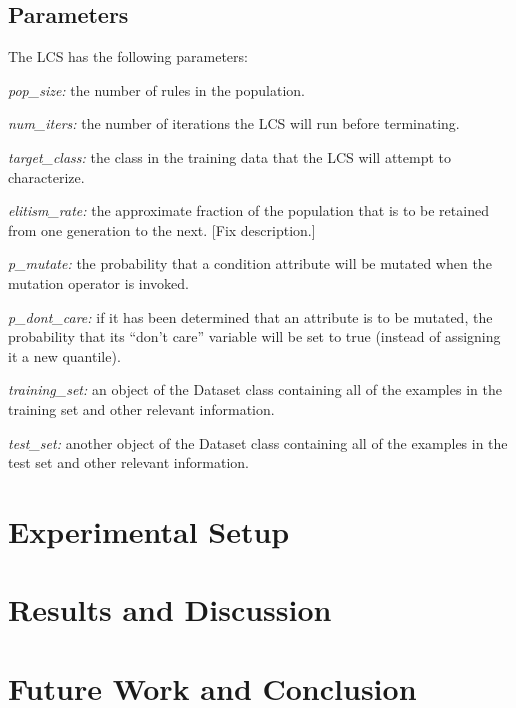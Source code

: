 \documentclass[11pt]{article}
\begin{document}
\subsection{Parameters}

The LCS has the following parameters:

\begin{description}
\item \textit{pop\_size:} the number of rules in the population.
\item \textit{num\_iters:} the number of iterations the LCS will run before terminating.
\item \textit{target\_class:} the class in the training data that the LCS will attempt to characterize.
\item \textit{elitism\_rate:} the approximate fraction of the population that is to be retained from one generation to the next. [Fix description.]
\item \textit{p\_mutate:} the probability that a condition attribute will be mutated when the mutation operator is invoked.
\item \textit{p\_dont\_care:} if it has been determined that an attribute is to be mutated, the probability that its ``don't care'' variable will be set to true (instead of assigning it a new quantile).
\item \textit{training\_set:} an object of the Dataset class containing all of the examples in the training set and other relevant information.
\item \textit{test\_set:} another object of the Dataset class containing all of the examples in the test set and other relevant information.
\end{description}
\section{Experimental Setup}
\section{Results and Discussion}
\section{Future Work and Conclusion}



\end{document}
